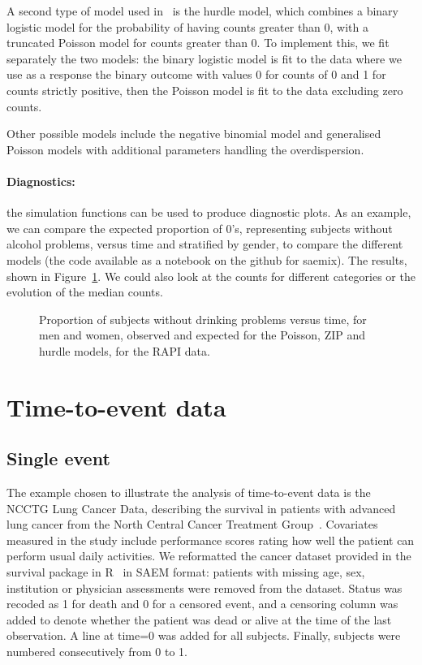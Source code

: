 A second type of model used in~\cite{Atkins13} is the hurdle model, which combines a binary logistic model for the probability of having counts greater than 0, with a truncated Poisson model for counts greater than 0. To implement this, we fit separately the two models: the binary logistic model is fit to the data where we use as a response the binary outcome with values 0 for counts of 0 and 1 for counts strictly positive, then the Poisson model is fit to the data excluding zero counts.

Other possible models include the negative binomial model and generalised Poisson models with additional parameters handling the overdispersion.

\paragraph{Diagnostics:} the simulation functions can be used to produce diagnostic plots. As an example, we can compare the expected proportion of 0's, representing subjects without alcohol problems, versus time and stratified by gender, to compare the different models (the code available as a notebook on the github for saemix). The results, shown in Figure~\ref{fig:rapiCompareProp0}. We could also look at the counts for different categories or the evolution of the median counts. 

\begin{figure}[!h]
\begin{center}
\end{center}
\par \kern -0.5cm
\caption{Proportion of subjects without drinking problems versus time, for men and women, observed and expected for the Poisson, ZIP and hurdle models, for the RAPI data.} \label{fig:rapiCompareProp0}
\end{figure}


\section{Time-to-event data}

\subsection{Single event} \label{sec:lungtte}

The example chosen to illustrate the analysis of time-to-event data is the NCCTG Lung Cancer Data, describing the survival in patients with advanced lung cancer from the North Central Cancer Treatment Group~\cite{Loprinzi94}. Covariates measured in the study include performance scores rating how well the patient can perform usual daily activities. We reformatted the {\sf cancer} dataset provided in the {\sf survival} package in R~\cite{survivalPkg} in SAEM format: patients with missing age, sex, institution or physician assessments were removed from the dataset. Status was recoded as 1 for death and 0 for a censored event, and a censoring column was added to denote whether the patient was dead or alive at the time of the last observation. A line at time=0 was added for all subjects. Finally, subjects were numbered consecutively from 0 to 1.

